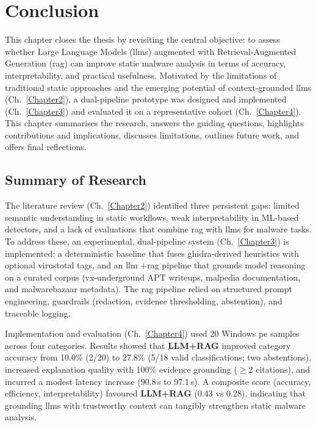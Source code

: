 \chapter{Conclusion}\label{sec:Conclusion}\label{Chapter5} %
This chapter closes the thesis by revisiting the central objective: to assess whether Large
Language Models (\glspl{llm}) augmented with Retrieval-Augmented Generation (\gls{rag}) can improve
static malware analysis in terms of accuracy, interpretability, and practical usefulness. Motivated
by the limitations of traditional static approaches and the emerging potential of context-grounded
\glspl{llm} (Ch.~\ref{Chapter2}), a dual-pipeline prototype was designed and implemented
(Ch.~\ref{Chapter3}) and evaluated it on a representative cohort (Ch.~\ref{Chapter4}). This chapter
summarises the research, answers the guiding questions, highlights contributions and implications,
discusses limitations, outlines future work, and offers final reflections.

\section{Summary of Research}
The literature review (Ch.~\ref{Chapter2}) identified three persistent gaps: limited semantic
understanding in static workflows, weak interpretability in ML-based detectors, and a lack of
evaluations that combine \gls{rag} with \glspl{llm} for malware tasks. To address these, an
experimental, dual-pipeline system (Ch.~\ref{Chapter3}) is implemented: a deterministic baseline
that fuses \gls{ghidra}-derived heuristics with optional \gls{virustotal} tags, and an \gls{llm}
+\gls{rag} pipeline that grounds model reasoning on a curated corpus (\gls{vx-underground} APT
writeups, \gls{malpedia} documentation, and \gls{malwarebazaar} metadata). The \gls{rag} pipeline
relied on structured prompt engineering, guardrails (redaction, evidence thresholding, abstention),
and traceable logging.

Implementation and evaluation (Ch.~\ref{Chapter4}) used 20 Windows \gls{pe} samples across four
categories. Results showed that \textbf{LLM+RAG} improved category accuracy from 10.0\% (2/20) to
27.8\% (5/18 valid classifications; two abstentions), increased explanation quality with 100\%
evidence grounding (\(\geq 2\) citations), and incurred a modest latency increase (90.8\,s to
97.1\,s). A composite score (accuracy, efficiency, interpretability) favoured \textbf{LLM+RAG}
(0.43 vs 0.28), indicating that grounding \glspl{llm} with trustworthy context can tangibly
strengthen static malware analysis.

